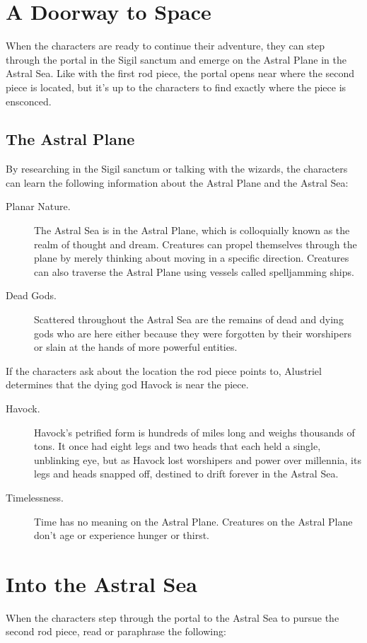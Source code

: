 \documentclass[10pt,a4paper,twoside,bg=print,twocolumn,openany,nodeprecatedcode]{dndbook}
\begin{document}
\section{A Doorway to Space}
When the characters are ready to continue their adventure, they can step through the portal in the Sigil sanctum and emerge on the Astral Plane in the Astral Sea. Like with the first rod piece, the portal opens near where the second piece is located, but it's up to the characters to find exactly where the piece is ensconced.

\subsection{The Astral Plane}
By researching in the Sigil sanctum or talking with the wizards, the characters can learn the following information about the Astral Plane and the Astral Sea:


\begin{description}
\item[Planar Nature.]
The Astral Sea is in the Astral Plane, which is colloquially known as the realm of thought and dream. Creatures can propel themselves through the plane by merely thinking about moving in a specific direction. Creatures can also traverse the Astral Plane using vessels called spelljamming ships.
\item[Dead Gods.]
Scattered throughout the Astral Sea are the remains of dead and dying gods who are here either because they were forgotten by their worshipers or slain at the hands of more powerful entities.
\end{description}

If the characters ask about the location the rod piece points to, Alustriel determines that the dying god Havock is near the piece.


\begin{description}
\item[Havock.]
Havock's petrified form is hundreds of miles long and weighs thousands of tons. It once had eight legs and two heads that each held a single, unblinking eye, but as Havock lost worshipers and power over millennia, its legs and heads snapped off, destined to drift forever in the Astral Sea.
\item[Timelessness.]
Time has no meaning on the Astral Plane. Creatures on the Astral Plane don't age or experience hunger or thirst.
\end{description}

\section{Into the Astral Sea}
When the characters step through the portal to the Astral Sea to pursue the second rod piece, read or paraphrase the following:
\end{document}
